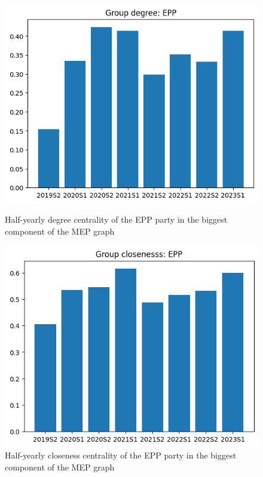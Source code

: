 \documentclass[lettersize,journal]{IEEEtran}
\begin{document}
\begin{figure}[h]
  \centering
  \begin{minipage}[b]{0.23\textwidth}
    \includegraphics[width=\textwidth]{EPP_HY_deg.png}
    \caption{Half-yearly degree centrality of the EPP party in the biggest component of the MEP graph}
    \label{EPP_HY_deg}
  \end{minipage}
  \hfill
  \begin{minipage}[b]{0.23\textwidth}
    \includegraphics[width=\textwidth]{EPP_HY_cls.png}
    \caption{Half-yearly closeness centrality of the EPP party in the  biggest component of the MEP graph}
    \label{EPP_HY_cls}
  \end{minipage}
\end{figure}
\end{document}
